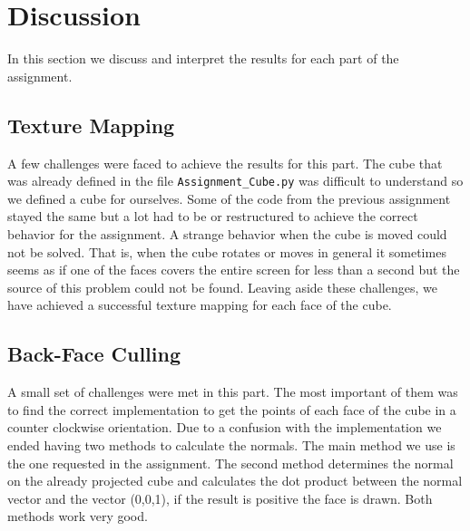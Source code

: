 \section{Discussion}
	In this section we discuss and interpret the results for each part of the assignment.
\subsection{Texture Mapping}
A few challenges were faced to achieve the results for this part. The cube that was already defined in the file \verb|Assignment_Cube.py| was difficult to understand so we defined a cube for ourselves. Some of the code from the previous assignment stayed the same but a lot had to be or restructured to achieve the correct behavior for the assignment. A strange behavior when the cube is moved could not be solved. That is, when the cube rotates or moves in general it sometimes seems as if one of the faces covers the entire screen for less than a second but the source of this problem could not be found. Leaving aside these challenges, we have achieved a successful texture mapping for each face of the cube.

\subsection{Back-Face Culling}
A small set of challenges were met in this part. The most important of them was to find the correct implementation to get the points of each face of the cube in a counter clockwise orientation. Due to a confusion with the implementation we ended having two methods to calculate the normals. The main method we use is the one requested in the assignment. The second method determines the normal on the already projected cube and calculates the dot product between the normal vector and the vector (0,0,1), if the result is positive the face is drawn. Both methods work very good.

